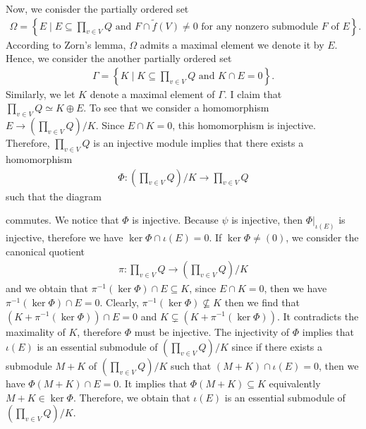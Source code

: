 \begin{solution}
    Now, we conisder the partially ordered set
    \begin{align*}
        \Omega = \left\{E\mid E\subseteq \prod_{v\in V} Q \text{ and }F\cap \tilde{f}(V)\neq 0\text{ for any nonzero submodule $F$ of $E$} \right\}.
    \end{align*}
    According to Zorn's lemma, $\Omega$ admits a maximal element we denote it by $E$. Hence, we consider the another partially ordered set 
    \begin{align*}
        \Gamma = \left\{K\mid K\subseteq \prod_{v\in V} Q \text{ and }K\cap E = 0 \right\}.
    \end{align*}
    Similarly, we let $K$ denote a maximal element of $\Gamma$. I claim that $\prod_{v\in V} Q\simeq K\oplus E$.
    To see that we consider a homomorphism $E \to (\prod_{v\in V} Q)/K$. Since $E\cap K =0$, this homomorphism is injective. Therefore, $\prod_{v\in V} Q$ is an injective module implies that 
    there exists a homomorphism 
    \begin{align*}
        \Phi:\left(\prod_{v\in V} Q\right)/K \to \prod_{v\in V} Q
    \end{align*}
    such that the diagram
    \begin{center}
    \end{center}
    commutes. We notice that $\Phi$ is injective. 
    Because $\psi$ is injective, then $\Phi|_{\iota(E)}$ is injective, therefore we have $\ker \Phi\cap \iota(E) = 0$.
    If $\ker \Phi\neq (0)$,  we consider the canonical quotient 
    \begin{align*}
        \pi:\prod_{v\in V} Q \to \left(\prod_{v\in V} Q\right)/K
    \end{align*}
    and we obtain that $\pi^{-1}(\ker \Phi)\cap E\subseteq K$, since $E\cap K=0$, then we have $\pi^{-1}(\ker \Phi)\cap E=0$.
    Clearly, $\pi^{-1}(\ker \Phi)\not\subseteq K$ then we find that $(K+\pi^{-1}(\ker\Phi))\cap E=0$ and $K\subsetneq(K+\pi^{-1}(\ker\Phi))$.
    It contradicts the maximality of $K$, therefore $\Phi$ must be injective.
    The injectivity of $\Phi$ implies that $\iota(E)$ is an essential submodule of $(\prod_{v\in V} Q)/K$ since if there exists a submodule $M+K$ of $\left(\prod_{v\in V} Q\right)/K$ such that $(M+K)\cap \iota(E)=0$,
    then we have $\Phi(M+K)\cap E = 0$. It implies that $\Phi(M+K)\subseteq K$ equivalently $M+K\in\ker \Phi$.
    Therefore, we obtain that $\iota(E)$ is an essential submodule of $(\prod_{v\in V} Q)/K$.


\end{solution}
